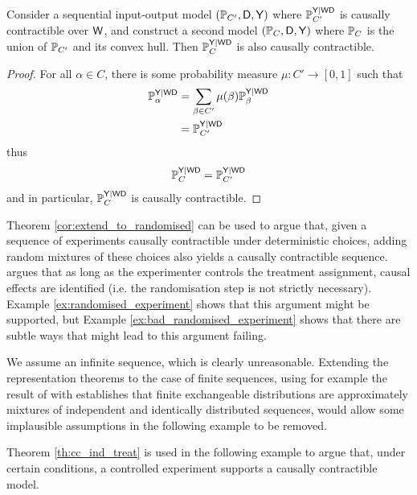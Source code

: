 \begin{theorem}\label{cor:extend_to_randomised}
Consider a sequential input-output model $(\mathbb{P}_{C'},\mathsf{D},\mathsf{Y})$ where $\mathbb{P}_{C'}^{\mathsf{Y}|\mathsf{WD}}$ is causally contractible over $\mathsf{W}$, and construct a second model $(\mathbb{P}_{C},\mathsf{D},\mathsf{Y})$ where $\mathbb{P}_C$ is the union of $\mathbb{P}_{C'}$ and its convex hull. Then $\mathbb{P}_{C}^{\mathsf{Y}|\mathsf{WD}}$ is also causally contractible.
\end{theorem}

\begin{proof}
For all $\alpha\in C$, there is some probability measure $\mu:C'\to [0,1]$ such that
\begin{align}
    \mathbb{P}_\alpha^{\mathsf{Y}|\mathsf{WD}} &= \sum_{\beta\in C'} \mu(\beta) \mathbb{P}_\beta^{\mathsf{Y}|\mathsf{WD}}\\
    &= \mathbb{P}_{C'}^{\mathsf{Y}|\mathsf{WD}}
\end{align}
thus
\begin{align}
    \mathbb{P}_C^{\mathsf{Y}|\mathsf{WD}} = \mathbb{P}_{C'}^{\mathsf{Y}|\mathsf{WD}}
\end{align}
and in particular, $\mathbb{P}_C^{\mathsf{Y}|\mathsf{WD}}$ is causally contractible.
\end{proof}

Theorem \ref{cor:extend_to_randomised} can be used to argue that, given a sequence of experiments causally contractible under deterministic choices, adding random mixtures of these choices also yields a causally contractible sequence. \citet{kasy_why_2016} argues that as long as the experimenter controls the treatment assignment, causal effects are identified (i.e. the randomisation step is not strictly necessary). Example \ref{ex:randomised_experiment} shows that this argument might be supported, but Example \ref{ex:bad_randomised_experiment} shows that there are subtle ways that might lead to this argument failing.

We assume an infinite sequence, which is clearly unreasonable. Extending the representation theorems to the case of finite sequences, using for example the result of \citet{diaconis_finite_1980} with establishes that finite exchangeable distributions are approximately mixtures of independent and identically distributed sequences, would allow some implausible assumptions in the following example to be removed.

Theorem \ref{th:cc_ind_treat} is used in the following example to argue that, under certain conditions, a controlled experiment supports a causally contractible model.

